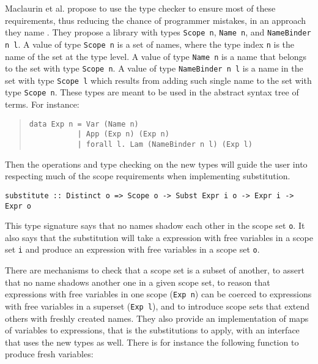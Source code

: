 \documentclass[sigconf, anonymous, review]{acmart}
\newcommand{\tc}[1]{{\small\texttt{#1}}}
\begin{document}
Maclaurin et al. propose to use the type checker to ensure most of these
requirements, thus reducing the chance of programmer mistakes, in an approach they
name . They
propose a library with types \tc{Scope n}, \tc{Name n}, and
\tc{Name\-Binder n l}. A value of type \tc{Scope n} is a set of names, where
the type index \tc{n} is the name of the set at the type level. A value of type \tc{Name n} is a name that
belongs to the set with type \tc{Scope n}. A value of type \tc{NameBinder n l} is
a name in the set with type \tc{Scope l} which results from adding such single
name to the set with type \tc{Scope n}. These types are meant to be used in
the abstract syntax tree of terms. For instance:

\begin{quotation}
\begin{verbatim}
data Exp n = Var (Name n)
           | App (Exp n) (Exp n)
           | forall l. Lam (NameBinder n l) (Exp l)
\end{verbatim}
\end{quotation}

Then the operations and type checking on the new types will guide the user into
respecting much of the scope requirements when implementing substitution.

\begin{verbatim}
substitute :: Distinct o => Scope o -> Subst Expr i o -> Expr i -> Expr o
\end{verbatim}

This type signature says that no names shadow each other in the scope set \tc{o}.
It also says that the substitution will take a expression with free variables in
a scope set \tc{i} and produce an expression with free variables in a scope set
\tc{o}.

There
are mechanisms to check that a scope set is a subset of another, to assert that no
name shadows another one in a given scope set, to reason that expressions
with free variables in one scope (\tc{Exp n}) can be coerced to expressions with
free variables in a superset (\tc{Exp l}), and to introduce scope sets that extend
others with freshly created names. They also provide an implementation of maps of
variables to expressions, that is the substitutions to apply, with an interface
that uses the new types as well. There is for instance the following function to
produce fresh variables:
\end{document}
